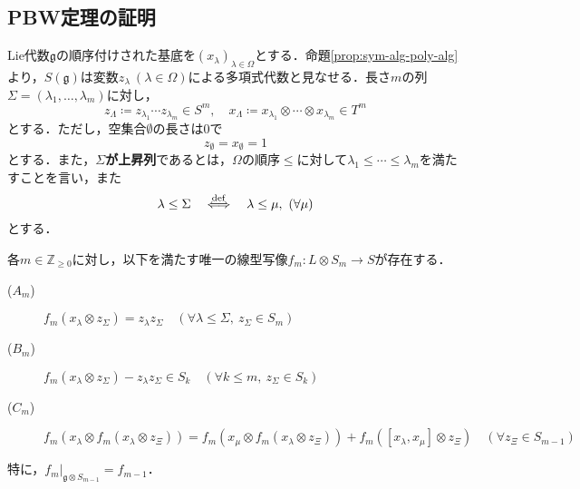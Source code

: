 \documentclass[rep_main]{subfiles}
\begin{document}
\subsection{PBW定理の証明}
Lie代数$\mathfrak{g}$の順序付けされた基底を$(x_\lambda)_{\lambda \in \Omega}$とする．命題\ref{prop:sym-alg-poly-alg}より，$S(\mathfrak{g})$は変数$z_\lambda\ (\lambda \in \Omega)$による多項式代数と見なせる．長さ$m$の列$\Sigma = (\lambda_1, \ldots, \lambda_m)$に対し，
\begin{equation}
	z_\Lambda \coloneqq z_{\lambda_1}\cdots z_{\lambda_m} \in S^m,\quad  x_\Lambda \coloneqq x_{\lambda_1}\otimes\cdots\otimes x_{\lambda_m} \in T^m
\end{equation}
とする．ただし，空集合$\emptyset$の長さは$0$で
\begin{equation}
	z_\emptyset = x_\emptyset = 1
\end{equation}
とする．また，\textbf{$\Sigma$が上昇列}であるとは，$\Omega$の順序$\leq$に対して$\lambda_1 \leq \cdots \leq \lambda_m$を満たすことを言い，また
\begin{equation}
	\lambda \leq \Sigma  \quad\stackrel{\mathrm{def}}{\Longleftrightarrow}\quad  \lambda \leq \mu,\ (\forall \mu)
\end{equation}
とする．
\begin{mylem}[label=lem:PBW-proof-A]{}
	各$m \in \mathbb{Z}_{\geq0}$に対し，以下を満たす唯一の線型写像$f_m\colon L \otimes S_m \to S$が存在する．
	\begin{description}
		\item[($A_m$)] $f_m(x_\lambda \otimes z_{\Sigma}) = z_\lambda z_\Sigma\quad  (\forall \lambda \leq \Sigma,\ z_\Sigma \in S_m)$
		\item[($B_m$)] $f_m(x_\lambda \otimes z_{\Sigma}) - z_\lambda z_\Sigma \in S_k\quad  (\forall k \leq m,\ z_\Sigma \in S_k)$
		\item[($C_m$)] $f_m(x_\lambda \otimes f_m(x_\lambda \otimes z_\Xi)) = f_m(x_\mu \otimes f_m(x_\lambda \otimes z_\Xi)) + f_m([x_\lambda, x_\mu] \otimes z_\Xi)\quad  (\forall z_\Xi \in S_{m-1})$
	\end{description}
	特に，$f_m|_{\mathfrak{g} \otimes S_{m-1}} = f_{m-1}$．
\end{mylem}
\end{document}
